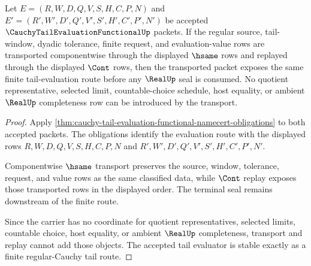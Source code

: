 \begin{theorem}
\label{thm:cauchy-tail-evaluation-functional-tail-stability}
Let $E=(R,W,D,Q,V,S,H,C,P,N)$ and $E'=(R',W',D',Q',V',S',H',C',P',N')$ be accepted $\CauchyTailEvaluationFunctionalUp$ packets. If the regular source, tail-window, dyadic tolerance, finite request, and evaluation-value rows are transported componentwise through the displayed $\hsame$ rows and replayed through the displayed $\Cont$ rows, then the transported packet exposes the same finite tail-evaluation route before any $\RealUp$ seal is consumed. No quotient representative, selected limit, countable-choice schedule, host equality, or ambient $\RealUp$ completeness row can be introduced by the transport.
\end{theorem}
\begin{proof}
Apply \autoref{thm:cauchy-tail-evaluation-functional-namecert-obligations} to both accepted packets. The obligations identify the evaluation route with the displayed rows $R,W,D,Q,V,S,H,C,P,N$ and $R',W',D',Q',V',S',H',C',P',N'$.

Componentwise $\hsame$ transport preserves the source, window, tolerance, request, and value rows as the same classified data, while $\Cont$ replay exposes those transported rows in the displayed order. The terminal seal remains downstream of the finite route.

Since the carrier has no coordinate for quotient representatives, selected limits, countable choice, host equality, or ambient $\RealUp$ completeness, transport and replay cannot add those objects. The accepted tail evaluator is stable exactly as a finite regular-Cauchy tail route.
\end{proof}



